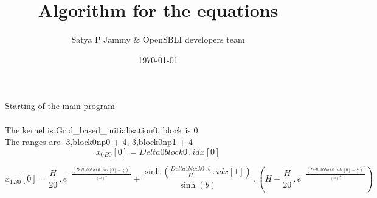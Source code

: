 \documentclass{article}
\title{Algorithm for the equations}
\author{Satya P Jammy \& OpenSBLI developers team}
\date{\today}
\begin{document}
\maketitle
\noindent Starting of the main program\\
\\\noindent The kernel is Grid_based_initialisation0, block is 0\\\noindent The ranges are -3,block0np0 + 4,-3,block0np1 + 4\\\begin{dmath}{x_{0}{_{B0}}}[{0}] = Delta0block0 \,.\, {idx}[{0}]\end{dmath}

\begin{dmath}{x_{1}{_{B0}}}[{0}] = \frac{H}{20} \,.\, e^{- \frac{\left(Delta0block0 \,.\, {idx}[{0}] - \frac{L}{3} \right)^{2}}{\left(a \right)^{2}}} + \frac{\sinh{\left (\frac{Delta1block0 \,.\, b}{H} \,.\, {idx}[{1}] \right )}}{\sinh{\left (b 
\right )}} \,.\, \left(H - \frac{H}{20} \,.\, e^{- \frac{\left(Delta0block0 \,.\, {idx}[{0}] - \frac{L}{3} \right)^{2}}{\left(a \right)^{2}}}\right)\end{dmath}
\end{document}
